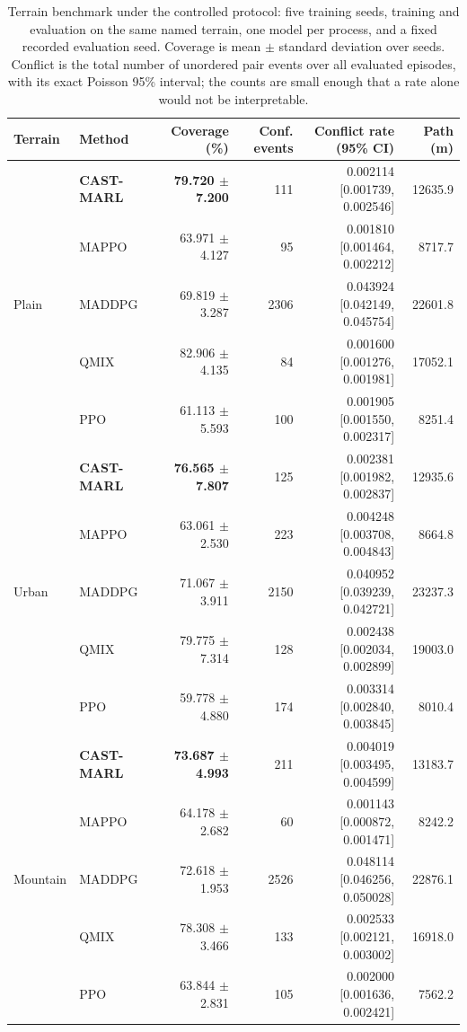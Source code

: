 \begin{table}[!t]

\centering
\caption{Terrain benchmark under the controlled protocol: five training seeds, training and evaluation on the same named terrain, one model per process, and a fixed recorded evaluation seed. Coverage is mean $\pm$ standard deviation over seeds. Conflict is the total number of unordered pair events over all evaluated episodes, with its exact Poisson 95\% interval; the counts are small enough that a rate alone would not be interpretable.}
\label{tab:benchmark}
\footnotesize
\setlength{\tabcolsep}{4pt}
\begin{tabular}{llrrrr}
\toprule
Terrain & Method & Coverage (\%) & Conf. events & Conflict rate (95\% CI) & Path (m) \\
\midrule
\multirow{5}{*}{Plain} & \textbf{CAST-MARL} & \textbf{79.720 $\pm$ 7.200} & 111 & 0.002114 [0.001739, 0.002546] & 12635.9 \\
 & MAPPO & 63.971 $\pm$ 4.127 & 95 & 0.001810 [0.001464, 0.002212] & 8717.7 \\
 & MADDPG & 69.819 $\pm$ 3.287 & 2306 & 0.043924 [0.042149, 0.045754] & 22601.8 \\
 & QMIX & 82.906 $\pm$ 4.135 & 84 & 0.001600 [0.001276, 0.001981] & 17052.1 \\
 & PPO & 61.113 $\pm$ 5.593 & 100 & 0.001905 [0.001550, 0.002317] & 8251.4 \\
\midrule
\multirow{5}{*}{Urban} & \textbf{CAST-MARL} & \textbf{76.565 $\pm$ 7.807} & 125 & 0.002381 [0.001982, 0.002837] & 12935.6 \\
 & MAPPO & 63.061 $\pm$ 2.530 & 223 & 0.004248 [0.003708, 0.004843] & 8664.8 \\
 & MADDPG & 71.067 $\pm$ 3.911 & 2150 & 0.040952 [0.039239, 0.042721] & 23237.3 \\
 & QMIX & 79.775 $\pm$ 7.314 & 128 & 0.002438 [0.002034, 0.002899] & 19003.0 \\
 & PPO & 59.778 $\pm$ 4.880 & 174 & 0.003314 [0.002840, 0.003845] & 8010.4 \\
\midrule
\multirow{5}{*}{Mountain} & \textbf{CAST-MARL} & \textbf{73.687 $\pm$ 4.993} & 211 & 0.004019 [0.003495, 0.004599] & 13183.7 \\
 & MAPPO & 64.178 $\pm$ 2.682 & 60 & 0.001143 [0.000872, 0.001471] & 8242.2 \\
 & MADDPG & 72.618 $\pm$ 1.953 & 2526 & 0.048114 [0.046256, 0.050028] & 22876.1 \\
 & QMIX & 78.308 $\pm$ 3.466 & 133 & 0.002533 [0.002121, 0.003002] & 16918.0 \\
 & PPO & 63.844 $\pm$ 2.831 & 105 & 0.002000 [0.001636, 0.002421] & 7562.2 \\
\bottomrule
\end{tabular}
\end{table}